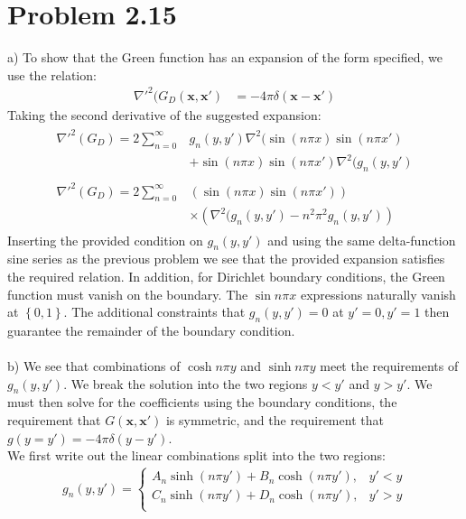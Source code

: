 \documentclass[a4paper,11pt]{article}
\numberwithin{equation}{section}
\newcommand{\bvp}[1]{\mathbf{#1}'}
\newcommand{\bv}[1]{\mathbf{#1}}
\newcommand{\lrp}[1]{\left({#1}\right)}
\newcommand{\lrb}[1]{\left\{{#1}\right\}}
\begin{document}
\section{Problem 2.15}
a) To show that the Green function has an expansion of the form specified, we use the relation:
\begin{align}
 \nabla'^2(G_D(\bv{x},\bvp{x}) &= -4\pi\delta(\bv{x}-\bvp{x})
\end{align}
Taking the second derivative of the suggested expansion:
\begin{align}
 \begin{split}
  \nabla'^2(G_D) = 2\sum_{n=0}^\infty &g_n(y,y')\nabla^2(\sin{(n\pi x)}\sin{(n\pi x')}\\
			    &+\sin{(n\pi x)}\sin{(n\pi x')}\nabla^2(g_n(y,y')
 \end{split}\\
 \begin{split}
 \nabla'^2(G_D) = 2\sum_{n=0}^\infty &\lrp{\sin{(n\pi x)}\sin{(n\pi x')}}\\
				     &\times\lrp{\nabla^2(g_n(y,y')-n^2\pi^2g_n(y,y')}
 \end{split}
\end{align}
Inserting the provided condition on $g_n(y,y')$ and using the same delta-function sine series as the previous problem we see  that the provided expansion satisfies the required relation.
In addition, for Dirichlet boundary conditions, the Green function must vanish on the boundary. The $\sin{n\pi x}$ expressions naturally vanish at $\lrb{0,1}$.
The additional constraints that $g_n(y,y')=0$ at $y'=0,y'=1$ then guarantee the remainder of the boundary condition.
\\ \\
b) We see that combinations of $\cosh{n\pi y}$ and $\sinh{n\pi y}$ meet the requirements of $g_n(y,y')$.
We break the solution into the two regions $y<y'$ and $y>y'$. 
We must then solve for the coefficients using the boundary conditions, the requirement that $G(\bv{x},\bvp{x})$ is symmetric, and the requirement that $g(y=y')=-4\pi\delta(y-y')$.\\
We first write out the linear combinations split into the two regions:
\begin{align}
 g_n(y,y') = \begin{cases}
              A_n\sinh{(n\pi y')}+B_n\cosh{(n\pi y')},&y'<y\\
              C_n\sinh{(n\pi y')}+D_n\cosh{(n\pi y')},&y'>y\\
             \end{cases}
\end{align}
\end{document}
